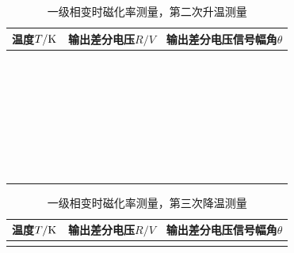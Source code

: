 \documentclass[11pt,a4paper]{ctexart}
\begin{document}
\begin{enumerate}
     \begin{table}[H]
\centering
\caption{一级相变时磁化率测量，第二次升温测量\label{tablez4}}
\begin{tabular}{|p{32mm}|p{32mm}|p{32mm}|}
\hline
温度$T/{\rm K}$ & 输出差分电压$R/{V}$ & 输出差分电压信号幅角$\theta$ \\ \hline
 & & \\ \hline
  & & \\ \hline
  & & \\ \hline
   & & \\ \hline
    & & \\ \hline
 & & \\ \hline
  &  &\\ \hline
  &  &\\ \hline
  &  &\\ \hline
  &  &\\ \hline
  &  &\\ \hline
  &  &\\ \hline
  &  &\\ \hline
  &  &\\ \hline
  &  &\\ \hline
  &  &\\ \hline
  &  &\\ \hline
  &  &\\ \hline
    & &\\ \hline
  & &\\ \hline
   & &\\ \hline
     &  &\\ \hline
  &  &\\ \hline
  &  &\\ \hline
  &  &\\ \hline
  &  &\\ \hline
  &  &\\ \hline
  &  &\\ \hline
  &  &\\ \hline
    & &\\ \hline
  & &\\ \hline
   & &\\ \hline
  \end{tabular}
  \end{table}
      \begin{table}[H]
\centering
\caption{一级相变时磁化率测量，第三次降温测量\label{tablez5}}
\begin{tabular}{|p{32mm}|p{32mm}|p{32mm}|}
\hline
温度$T/{\rm K}$ & 输出差分电压$R/{V}$ & 输出差分电压信号幅角$\theta$ \\ \hline
 & & \\ \hline

\end{tabular}
\end{table}
\end{enumerate}
\end{document}
